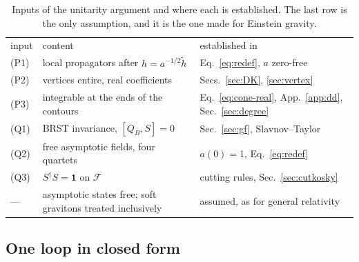 \documentclass[aps,prd,10pt,twocolumn,superscriptaddress,nofootinbib,floatfix,longbibliography]{revtex4-2}
\begin{document}
\begin{table}[t]
\caption{Inputs of the unitarity argument and where each is established. The last row is the only assumption, and it is the one made for Einstein gravity.}
\label{tab:unitarity}
\begin{ruledtabular}
\begin{tabular}{p{0.75cm}p{4.1cm}p{3.0cm}}
input & content & established in\\
\colrule
(P1) & local propagators after $h=a^{-1/2}\tilde h$ & Eq.~\eqref{eq:redef}, $a$ zero-free\\
(P2) & vertices entire, real coefficients & Secs.~\ref{sec:DK}, \ref{sec:vertex}\\
(P3) & integrable at the ends of the contours & Eq.~\eqref{eq:cone-real}, App.~\ref{app:dd}, Sec.~\ref{sec:degree}\\
(Q1) & BRST invariance, $[Q_B,S]=0$ & Sec.~\ref{sec:gf}, Slavnov--Taylor\\
(Q2) & free asymptotic fields, four quartets & $a(0)=1$, Eq.~\eqref{eq:redef}\\
(Q3) & $S^\dagger S=\mathbf 1$ on $\mathcal F$ & cutting rules, Sec.~\ref{sec:cutkosky}\\
--- & asymptotic states free; soft gravitons treated inclusively & assumed, as for general relativity~\cite{KugoOjima1978,Weinberg1965}\\
\end{tabular}
\end{ruledtabular}
\end{table}

\subsection{One loop in closed form}
\label{sec:bubble}
\end{document}
